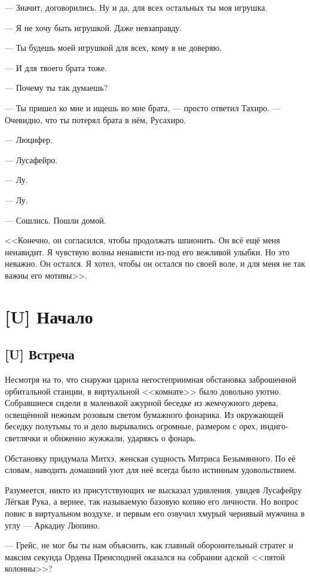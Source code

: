 --- Значит, договорились.
Ну и да, для всех остальных ты моя игрушка.

--- Я не хочу быть игрушкой.
Даже невзаправду.

--- Ты будешь моей игрушкой для всех, кому я не доверяю.

--- И для твоего брата тоже.

--- Почему ты так думаешь?

--- Ты пришел ко мне и ищешь во мне брата, --- просто ответил Тахиро.
--- Очевидно, что ты потерял брата в нём, Русахиро.

--- Люцифер.

--- Лусафейро.

--- Лу.

--- Лу.

--- Сошлись.
Пошли домой.

<<Конечно, он согласился, чтобы продолжать шпионить.
Он всё ещё меня ненавидит.
Я чувствую волны ненависти из-под его вежливой улыбки.
Но это неважно.
Он остался.
Я хотел, чтобы он остался по своей воле, и для меня не так важны его мотивы>>.

\chapter{[U] Начало}

\section{[U] Встреча}

\textspace

Несмотря на то, что снаружи царила негостеприимная обстановка заброшенной орбитальной станции, в виртуальной <<комнате>> было довольно уютно.
Собравшиеся сидели в маленькой ажурной беседке из жемчужного дерева, освещённой нежным розовым светом бумажного фонарика.
Из окружающей беседку полутьмы то и дело вырывались огромные, размером с орех, индиго-светлячки и обиженно жужжали, ударяясь о фонарь.

Обстановку придумала Митхэ, женская сущность Митриса Безымянного.
По её словам, наводить домашний уют для неё всегда было истинным удовольствием.

Разумеется, никто из присутствующих не высказал удивления, увидев Лусафейру Лёгкая Рука, а вернее, так называемую базовую копию его личности.
Но вопрос повис в виртуальном воздухе, и первым его озвучил хмурый чернявый мужчина в углу --- Аркадиу Люпино.

--- Грейс, не мог бы ты нам объяснить, как главный оборонительный стратег и максим секунда Ордена Преисподней оказался на собрании адской <<пятой колонны>>?

